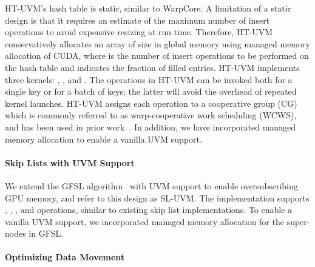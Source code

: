 \documentclass[12pt,a4paper]{article}
\newcommand{\htuvm}{\textsf{HT-UVM}\xspace}
\newcommand{\Htuvm}{\textsf{HT-UVM}\xspace}
\newcommand{\skipuvm}{\textsf{SL-UVM}\xspace}
\begin{document}
\Htuvm's hash table is static, similar to WarpCore. A limitation of a static
design is that it requires an estimate of the maximum number of insert
operations to avoid expensive resizing at run time. Therefore, \htuvm conservatively
allocates an array of size 
in global memory using managed memory allocation of CUDA, where
 is the number of insert operations to be performed on the
hash table and  indicates the fraction of filled entries.
\Htuvm implements three kernels: , , and
.
The operations in \htuvm can be invoked both for a single key or for a batch of
keys; the latter will avoid the overhead of repeated kernel launches. \Htuvm
assigns each operation to a cooperative group (CG) which is commonly referred to
as warp-cooperative work scheduling (WCWS), and has been used in prior work~\cite{gfsl-pact-2017,warpcore-hipc-2020}. In addition, we have incorporated managed memory allocation to enable a vanilla UVM support.

\paragraph*{Skip Lists with UVM Support}

We extend the GFSL algorithm~\cite{gfsl-pact-2017} with UVM support to enable
oversubscribing GPU memory, and refer to this design as \skipuvm. The
implementation supports , ,
, and  operations, similar to existing
skip list implementations.
To enable a vanilla UVM support, we incorporated managed memory allocation for
the super-nodes in GFSL. 

\paragraph*{Optimizing Data Movement}
\end{document}
